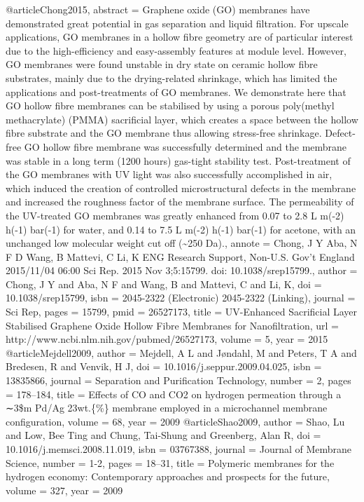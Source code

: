 @article{Chong2015,
abstract = {Graphene oxide (GO) membranes have demonstrated great potential in gas separation and liquid filtration. For upscale applications, GO membranes in a hollow fibre geometry are of particular interest due to the high-efficiency and easy-assembly features at module level. However, GO membranes were found unstable in dry state on ceramic hollow fibre substrates, mainly due to the drying-related shrinkage, which has limited the applications and post-treatments of GO membranes. We demonstrate here that GO hollow fibre membranes can be stabilised by using a porous poly(methyl methacrylate) (PMMA) sacrificial layer, which creates a space between the hollow fibre substrate and the GO membrane thus allowing stress-free shrinkage. Defect-free GO hollow fibre membrane was successfully determined and the membrane was stable in a long term (1200 hours) gas-tight stability test. Post-treatment of the GO membranes with UV light was also successfully accomplished in air, which induced the creation of controlled microstructural defects in the membrane and increased the roughness factor of the membrane surface. The permeability of the UV-treated GO membranes was greatly enhanced from 0.07 to 2.8 L m(-2) h(-1) bar(-1) for water, and 0.14 to 7.5 L m(-2) h(-1) bar(-1) for acetone, with an unchanged low molecular weight cut off ({\~{}}250 Da).},
annote = {Chong, J Y
Aba, N F D
Wang, B
Mattevi, C
Li, K
ENG
Research Support, Non-U.S. Gov't
England
2015/11/04 06:00
Sci Rep. 2015 Nov 3;5:15799. doi: 10.1038/srep15799.},
author = {Chong, J Y and Aba, N F and Wang, B and Mattevi, C and Li, K},
doi = {10.1038/srep15799},
isbn = {2045-2322 (Electronic)
2045-2322 (Linking)},
journal = {Sci Rep},
pages = {15799},
pmid = {26527173},
title = {{UV-Enhanced Sacrificial Layer Stabilised Graphene Oxide Hollow Fibre Membranes for Nanofiltration}},
url = {http://www.ncbi.nlm.nih.gov/pubmed/26527173},
volume = {5},
year = {2015}
}
@article{Mejdell2009,
author = {Mejdell, A L and J{\o}ndahl, M and Peters, T A and Bredesen, R and Venvik, H J},
doi = {10.1016/j.seppur.2009.04.025},
isbn = {13835866},
journal = {Separation and Purification Technology},
number = {2},
pages = {178--184},
title = {{Effects of CO and CO2 on hydrogen permeation through a ∼3{\$}\mu{\$}m Pd/Ag 23wt.{\{}{\%}{\}} membrane employed in a microchannel membrane configuration}},
volume = {68},
year = {2009}
}
@article{Shao2009,
author = {Shao, Lu and Low, Bee Ting and Chung, Tai-Shung and Greenberg, Alan R},
doi = {10.1016/j.memsci.2008.11.019},
isbn = {03767388},
journal = {Journal of Membrane Science},
number = {1-2},
pages = {18--31},
title = {{Polymeric membranes for the hydrogen economy: Contemporary approaches and prospects for the future}},
volume = {327},
year = {2009}
}
